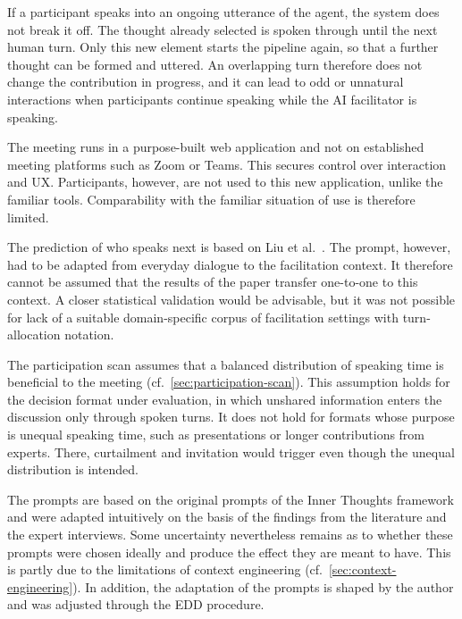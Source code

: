 If a participant speaks into an ongoing utterance of the agent, the system
does not break it off.
The thought already selected is spoken through until the next human turn.
Only this new element starts the pipeline again, so that a further thought can be formed and
uttered.
An overlapping turn therefore does not change the contribution in progress, and it can lead to odd or
unnatural interactions when participants continue speaking while the AI facilitator is speaking.

The meeting runs in a purpose-built web application and not on established meeting platforms such as
Zoom or Teams. This secures control over interaction and UX. Participants, however, are not used to
this new application, unlike the familiar tools.
Comparability with the familiar situation of use is therefore limited.

The prediction of who speaks next is based on Liu et al.\
\cite{liuProactiveConversationalAgents2025}.
The prompt, however, had to be adapted from everyday dialogue to the facilitation context.
It therefore cannot be assumed that the results of the paper transfer one-to-one to this context.
A closer statistical validation would be advisable, but it was not possible for lack of a suitable
domain-specific corpus of facilitation settings with turn-allocation notation.

The participation scan assumes that a balanced distribution of speaking time is
beneficial to the meeting (cf.\ \autoref{sec:participation-scan}).
This assumption holds for the decision format under evaluation, in which unshared information
enters the discussion only through spoken turns.
It does not hold for formats whose purpose is unequal speaking time, such as presentations or
longer contributions from experts.
There, curtailment and invitation would trigger even though the unequal distribution is intended.

The prompts are based on the original prompts of the Inner Thoughts framework and were adapted
intuitively on the basis of the findings from the literature and the expert interviews.
Some uncertainty nevertheless remains as to whether these prompts were chosen ideally and produce
the effect they are meant to have. This is partly due to the limitations of context engineering
(cf.\ \autoref{sec:context-engineering}).
In addition, the adaptation of the prompts is shaped by the author and was adjusted through the
EDD procedure.
